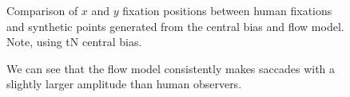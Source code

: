 \begin{figure}[htb]
\centering
{}
\caption{Comparison of $x$ and $y$ fixation positions between human fixations and synthetic points generated from the central bias and flow model. Note, using tN central bias.}
\label{fig:xyDist}
\end{figure}

\begin{figure}[htb]
\centering
{}
\caption{We can see that the flow model consistently makes saccades with a slightly larger amplitude than human observers.}
\label{fig:saccAmp}
\end{figure}


